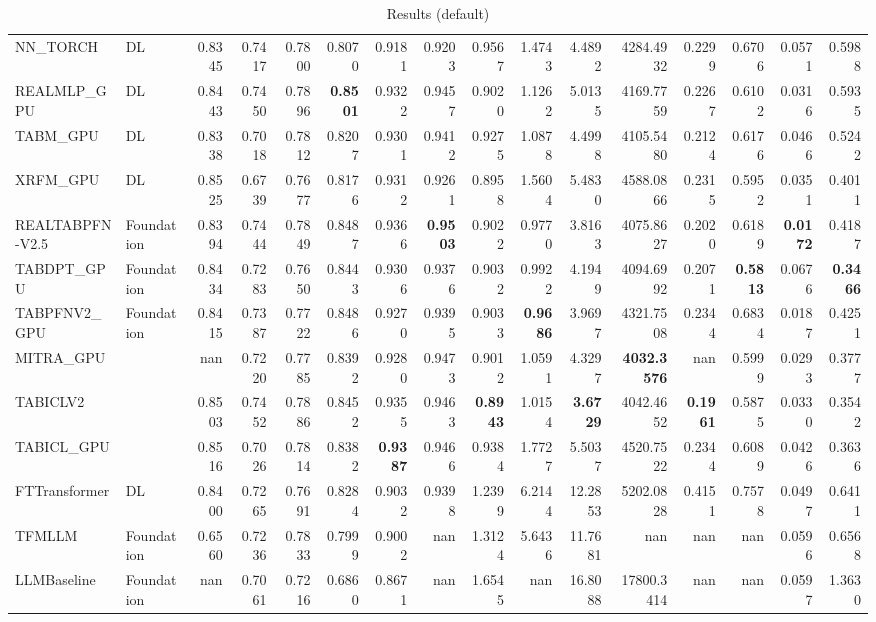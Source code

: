 \begin{table}[htbp]
{\begin{tabular}{ll|rrrrrrrrrrrrrr}
NN\_TORCH & DL & 0.8345 & 0.7417 & 0.7800 & 0.8070 & 0.9181 & 0.9203 & 0.9567 & 1.4743 & 4.4892 & 4284.4932 & 0.2299 & 0.6706 & 0.0571 & 0.5988 \\
REALMLP\_GPU & DL & 0.8443 & 0.7450 & 0.7896 & \textbf{0.8501} & 0.9322 & 0.9457 & 0.9020 & 1.1262 & 5.0135 & 4169.7759 & 0.2267 & 0.6102 & 0.0316 & 0.5935 \\
TABM\_GPU & DL & 0.8338 & 0.7018 & 0.7812 & 0.8207 & 0.9301 & 0.9412 & 0.9275 & 1.0878 & 4.4998 & 4105.5480 & 0.2124 & 0.6176 & 0.0466 & 0.5242 \\
XRFM\_GPU & DL & 0.8525 & 0.6739 & 0.7677 & 0.8176 & 0.9312 & 0.9261 & 0.8958 & 1.5604 & 5.4830 & 4588.0866 & 0.2315 & 0.5952 & 0.0351 & 0.4011 \\
REALTABPFN-V2.5 & Foundation & 0.8394 & 0.7444 & 0.7849 & 0.8487 & 0.9366 & \textbf{0.9503} & 0.9022 & 0.9770 & 3.8163 & 4075.8627 & 0.2020 & 0.6189 & \textbf{0.0172} & 0.4187 \\
TABDPT\_GPU & Foundation & 0.8434 & 0.7283 & 0.7650 & 0.8443 & 0.9306 & 0.9376 & 0.9032 & 0.9922 & 4.1949 & 4094.6992 & 0.2071 & \textbf{0.5813} & 0.0676 & \textbf{0.3466} \\
TABPFNV2\_GPU & Foundation & 0.8415 & 0.7387 & 0.7722 & 0.8486 & 0.9270 & 0.9395 & 0.9033 & \textbf{0.9686} & 3.9697 & 4321.7508 & 0.2344 & 0.6834 & 0.0187 & 0.4251 \\
MITRA\_GPU &  & nan & 0.7220 & 0.7785 & 0.8392 & 0.9280 & 0.9473 & 0.9012 & 1.0591 & 4.3297 & \textbf{4032.3576} & nan & 0.5999 & 0.0293 & 0.3777 \\
TABICLV2 &  & 0.8503 & 0.7452 & 0.7886 & 0.8452 & 0.9355 & 0.9463 & \textbf{0.8943} & 1.0154 & \textbf{3.6729} & 4042.4652 & \textbf{0.1961} & 0.5875 & 0.0330 & 0.3542 \\
TABICL\_GPU &  & 0.8516 & 0.7026 & 0.7814 & 0.8382 & \textbf{0.9387} & 0.9466 & 0.9384 & 1.7727 & 5.5037 & 4520.7522 & 0.2344 & 0.6089 & 0.0426 & 0.3636 \\
\midrule
FTTransformer & DL & 0.8400 & 0.7265 & 0.7691 & 0.8284 & 0.9032 & 0.9398 & 1.2399 & 6.2144 & 12.2853 & 5202.0828 & 0.4151 & 0.7578 & 0.0497 & 0.6411 \\
TFMLLM & Foundation & 0.6560 & 0.7236 & 0.7833 & 0.7999 & 0.9002 & nan & 1.3124 & 5.6436 & 11.7681 & nan & nan & nan & 0.0596 & 0.6568 \\
LLMBaseline & Foundation & nan & 0.7061 & 0.7216 & 0.6860 & 0.8671 & nan & 1.6545 & nan & 16.8088 & 17800.3414 & nan & nan & 0.0597 & 1.3630 \\
\bottomrule
\end{tabular}
}
\caption{Results (default)}
\label{tab:results_default}
\end{table}